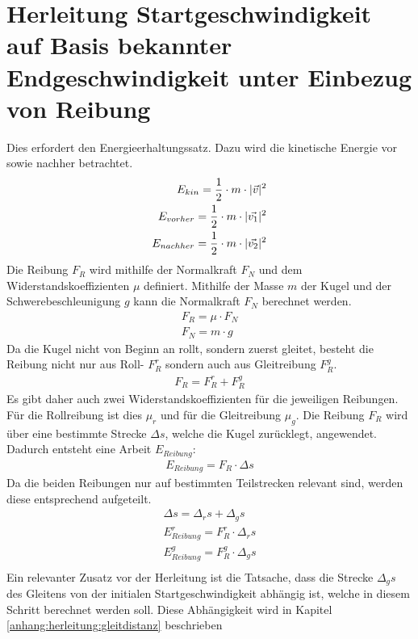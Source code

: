 \section{Herleitung Startgeschwindigkeit auf Basis bekannter Endgeschwindigkeit unter Einbezug von Reibung}\label{anhang:herleitung:StartgeschwAnhandEndgeschwMitReibung}
Dies erfordert den Energieerhaltungssatz. Dazu wird die kinetische Energie vor sowie nachher betrachtet.
\begin{align}
    E_{kin} = \frac{1}{2} \cdot m \cdot \lvert \vec{v} \rvert^2\\
    E_{vorher} = \frac{1}{2} \cdot m \cdot \lvert \vec{v_1} \rvert^2\\
    E_{nachher} = \frac{1}{2} \cdot m \cdot \lvert \vec{v_2} \rvert^2
\end{align}
Die Reibung $F_R$ wird mithilfe der Normalkraft $F_N$ und dem Widerstandskoeffizienten $\mu$ definiert\cite{wiki.rollreibung:1}.
Mithilfe der Masse $m$ der Kugel und der Schwerebeschleunigung $g$ kann die Normalkraft $F_N$ berechnet werden.
\begin{align}
    F_R = \mu \cdot F_N\\
    F_N = m \cdot g
\end{align}
Da die Kugel nicht von Beginn an rollt, sondern zuerst gleitet, besteht die Reibung nicht nur aus Roll- $F^r_R$ sondern auch aus
Gleitreibung $F^g_R$.
\begin{align}
    F_R = F^r_R + F^g_R
\end{align}
Es gibt daher auch zwei Widerstandskoeffizienten für die jeweiligen Reibungen. Für die Rollreibung ist dies $\mu_r$ und
für die Gleitreibung $\mu_g$.
Die Reibung $F_R$ wird über eine bestimmte Strecke $\Delta s$, welche die Kugel zurücklegt, angewendet.
Dadurch entsteht eine Arbeit $E_{Reibung}$\cite{wiki.arbeit_physik:1}:
\begin{align}
    E_{Reibung} = F_R \cdot \Delta s
\end{align}
Da die beiden Reibungen nur auf bestimmten Teilstrecken relevant sind, werden diese entsprechend aufgeteilt.
\begin{align}
    \Delta s = \Delta_r s + \Delta_g s\\
    E^r_{Reibung} = F^r_R \cdot \Delta_r s\\
    E^g_{Reibung} = F^g_R \cdot \Delta_g s\\
\end{align}
Ein relevanter Zusatz vor der Herleitung ist die Tatsache, dass die Strecke $\Delta_g s$ des Gleitens von der initialen
Startgeschwindigkeit abhängig ist, welche in diesem Schritt berechnet werden soll. Diese Abhängigkeit wird in Kapitel \ref{anhang:herleitung:gleitdistanz} beschrieben
